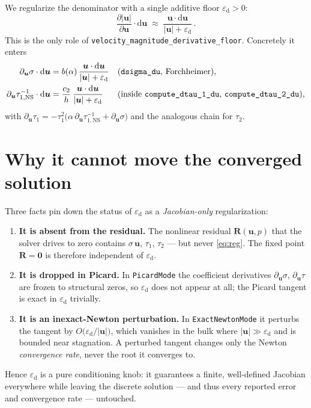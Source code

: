 \documentclass[11pt]{article}
\newcommand{\eps}{\varepsilon_{\mathrm{d}}}          %
\newcommand{\uu}{\bm{u}}
\newcommand{\du}{\mathrm{d}\bm{u}}
\newcommand{\norm}[1]{\lvert #1 \rvert}
\begin{document}
We regularize the denominator with a single additive floor $\eps>0$:
\begin{equation}\label{eq:reg}
  \frac{\partial \norm{\uu}}{\partial \uu}\cdot\du
  \;\approx\; \frac{\uu\cdot\du}{\norm{\uu}+\eps}\,.
\end{equation}
This is the only role of \texttt{velocity\_magnitude\_derivative\_floor}. Concretely it enters
\begin{align}
  \partial_{\uu}\sigma\cdot\du
    &= b(\alpha)\,\frac{\uu\cdot\du}{\norm{\uu}+\eps}
    && \text{(\texttt{dsigma\_du}, Forchheimer)},\\
  \partial_{\uu}\tau_{1,\mathrm{NS}}^{-1}\cdot\du
    &= \frac{c_2}{h}\,\frac{\uu\cdot\du}{\norm{\uu}+\eps}
    && \text{(inside \texttt{compute\_dtau\_1\_du}, \texttt{compute\_dtau\_2\_du})},
\end{align}
with $\partial_{\uu}\tau_1=-\tau_1^2\big(\alpha\,\partial_{\uu}\tau_{1,\mathrm{NS}}^{-1}
+\partial_{\uu}\sigma\big)$ and the analogous chain for $\tau_2$.

\section{Why it cannot move the converged solution}

Three facts pin down the status of $\eps$ as a \emph{Jacobian-only} regularization:
\begin{enumerate}
  \item \textbf{It is absent from the residual.} The nonlinear residual $\bm R(\uu,p)$ that the solver
        drives to zero contains $\sigma\,\uu$, $\tau_1$, $\tau_2$ --- but never \eqref{eq:reg}. The fixed
        point $\bm R=\bm 0$ is therefore independent of $\eps$.
  \item \textbf{It is dropped in Picard.} In \texttt{PicardMode} the coefficient derivatives
        $\partial_{\uu}\sigma$, $\partial_{\uu}\tau$ are frozen to structural zeros, so $\eps$ does not
        appear at all; the Picard tangent is exact in $\eps$ trivially.
  \item \textbf{It is an inexact-Newton perturbation.} In \texttt{ExactNewtonMode} it perturbs the tangent
        by $O\!\big(\eps/\norm{\uu}\big)$, which vanishes in the bulk where $\norm{\uu}\gg\eps$ and is
        bounded near stagnation. A perturbed tangent changes only the Newton \emph{convergence rate}, never
        the root it converges to.
\end{enumerate}
Hence $\eps$ is a pure conditioning knob: it guarantees a finite, well-defined Jacobian everywhere while
leaving the discrete solution --- and thus every reported error and convergence rate --- untouched.
\end{document}
